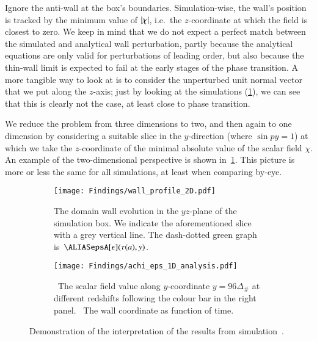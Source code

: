 




Ignore the anti-wall at the box's boundaries. 
Simulation-wise, the wall's position is tracked by the minimum value of $\abs{\chi}$, i.e.~the $z$-coordinate at which the field is closest to zero. %
We keep in mind that we do not expect a perfect match between the simulated and analytical wall perturbation, partly because the analytical equations are only valid for perturbations of leading order, but also because the thin-wall limit is expected to fail at the early stages of the phase transition. A more tangible way to look at is to consider the unperturbed unit normal vector that we put along the $z$-axis; just by looking at the simulations (\cref{fig:results:epsilon:wall_profile_2D}), we can see that this is clearly not the case, at least close to phase transition.


We reduce the problem from three dimensions to two, and then again to one dimension by considering a suitable slice in the $y$-direction %
(where $\sin{py} =1$) %
at which we take the $z$-coordinate of the minimal absolute value of the scalar field $\chi$. An example of the two-dimensional perspective is shown in~\cref{fig:results:epsilon:wall_profile_2D}. This picture is more or less the same for all simulations, at least when comparing by-eye. 

\begin{figure}[ht]
    \centering
    \begin{subfigure}[b]{\linewidth}
        \centering
        \texttt{[image: Findings/wall\_profile\_2D.pdf]}
        \caption{The domain wall evolution in the $yz$-plane of the simulation box. We indicate the aforementioned slice with a grey vertical line. The dash-dotted green graph is~$\epsA[\epsilon](\tau(a), y)$.}
        \label{fig:results:epsilon:wall_profile_2D}
    \end{subfigure}
    \hfill
    \begin{subfigure}[b]{\linewidth}
        \centering
        \texttt{[image: Findings/achi\_eps\_1D\_analysis.pdf]}
        \caption{~The scalar field value along $y$-coordinate $y=96\Delta_\#$ at different redshifts following the colour bar in the right panel. ~The wall coordinate as function of time.}
        \label{fig:results:epsilon:achi_eps_1D_analysis}
    \end{subfigure}
    \caption{Demonstration of the interpretation of the results from simulation~.}
    \label{fig:results:epsilon:from_achi_to_epsilon}
\end{figure}


